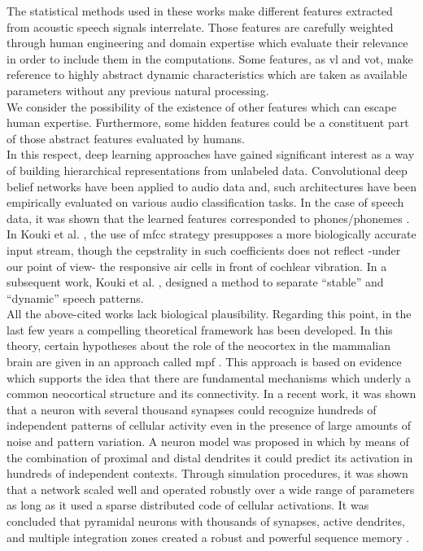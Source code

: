 \documentclass[11pt,a4paper]{article}
\begin{document}
The statistical methods used in these works make
different features extracted from acoustic speech signals
interrelate.
Those features are carefully weighted
through human engineering and domain expertise
which evaluate their relevance in order to include them
in the computations.
Some features, as \gls{vl} and \gls{vot},
make reference to highly abstract dynamic characteristics
which are taken
as available parameters without any previous natural
processing.\\

We consider the possibility of the existence of other
features which can escape human expertise.
Furthermore, some hidden features could be a constituent
part of those abstract features evaluated by humans. \\

In this respect, deep learning approaches have gained significant interest as a
way of building hierarchical representations from unlabeled data.
Convolutional deep belief networks have been applied to audio data and,
such architectures have been empirically evaluated on various audio classification
tasks. In the case of speech data, it was shown that the learned features corresponded
to phones/phonemes \cite{Lee:2009:UFL:2984093.2984217}. \\

In Kouki et al. \cite{kouki_2010},
the use of \gls{mfcc}
strategy presupposes a more biologically accurate input stream,
though the cepstrality in such coefficients does not reflect
-under our point of view-
the responsive air cells in front of cochlear vibration.
In a subsequent work, Kouki et al. \cite{kouki_2011},
designed a method to separate “stable” and “dynamic” speech
patterns. \\

All the above-cited works lack biological plausibility.
Regarding this point, in the last few years a compelling
theoretical framework has been developed.
In this theory, certain hypotheses about the role of
the neocortex in the mammalian brain are given in an
approach called \gls{mpf}
\cite{hawkins_2004}.
This approach is based on evidence
which supports the idea that there are fundamental
mechanisms which underly a common neocortical
structure and its connectivity.
In a recent work, it was shown that a neuron with
several thousand synapses could recognize hundreds
of independent patterns of cellular activity even
in the presence of large amounts of
noise and pattern variation.
A neuron model was proposed in which by means of
the combination of proximal and distal dendrites
it could predict its activation in hundreds of independent contexts.
Through simulation procedures, it was shown that a network
scaled well and operated robustly over a wide range of parameters as long as it
used a sparse distributed code of cellular activations.
It was concluded that pyramidal neurons with thousands of
synapses, active dendrites, and multiple integration zones
created a robust and powerful
sequence memory \cite{hawkins_2016}. \\
\end{document}
